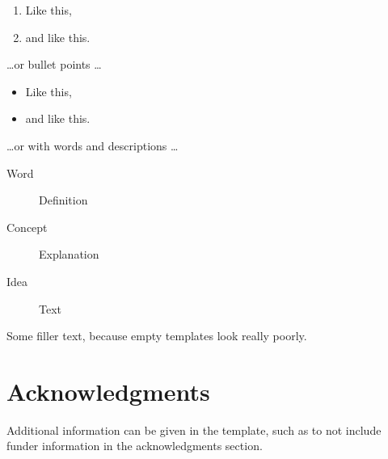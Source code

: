 \documentclass[9pt,lineno]{elife}
\begin{document}
\begin{enumerate}
\item Like this,
\item and like this.
\end{enumerate}
\dots or bullet points \dots
\begin{itemize} 
\item Like this,
\item and like this.
\end{itemize}
\dots or with words and descriptions \dots
\begin{description}
\item[Word] Definition
\item[Concept] Explanation
\item[Idea] Text
\end{description}

Some filler text, because empty templates look really poorly. \lipsum[1]


\section{Acknowledgments}

Additional information can be given in the template, such as to not include funder information in the acknowledgments section.

\nocite{*} %


\end{document}

